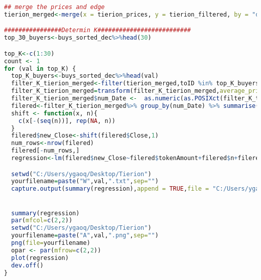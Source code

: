 \begin{lstlisting}[language=R]
## merge the prices and edge
tierion_merged<-merge(x = tierion_prices, y = tierion_filtered, by = "date", all.x = TRUE)

################Determin K##########################
top_30_buyers<-buys_sorted_dec%>%head(30)

top_K<-c(1:30)
count <- 1
for (val in top_K) {
  top_K_buyers<-buys_sorted_dec%>%head(val)
  filter_K_tierion_merged<-filter(tierion_merged,toID %in% top_K_buyers$toID)
  filter_K_tierion_merged=transform(filter_K_tierion_merged,average_price= (Open+Close)/2)
  filter_K_tierion_merged$num_Date <-  as.numeric(as.POSIXct(filter_K_tierion_merged$date))
  filered<-filter_K_tierion_merged%>% group_by(num_Date) %>% summarise(n = n(),Close=mean(Close),tokenAmount=sum(tokenAmount),Open=mean(Open))
  shift <- function(x, n){
    c(x[-(seq(n))], rep(NA, n))
  }
  filered$new_Close<-shift(filered$Close,1)
  num_rows<-nrow(filered)
  filered[-num_rows,]
  regression<-lm(filered$new_Close~filered$tokenAmount+filered$n+filered$Open)

  setwd("C:/Users/ygaoq/Desktop/Tierion")
  yourfilename=paste("W",val,".txt",sep="")
  capture.output(summary(regression),append = TRUE,file = "C:/Users/ygaoq/Desktop/Tierion/Final_Result.txt")


  summary(regression)
  par(mfcol=c(2,2))
  setwd("C:/Users/ygaoq/Desktop/Tierion")
  yourfilename=paste("A",val,".png",sep="")
  png(file=yourfilename)
  opar <- par(mfrow=c(2,2))
  plot(regression)
  dev.off()
}



\end{lstlisting}
